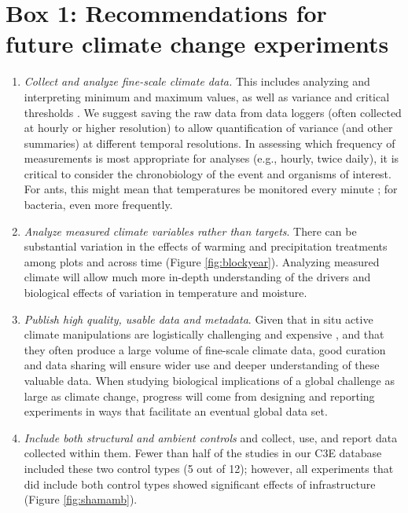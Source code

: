 \documentclass{article}
\begin{document}
\section* {Box 1: Recommendations for future climate change experiments} 
\begin{enumerate}
\item\textit{Collect and analyze fine-scale climate data.} This includes analyzing and interpreting minimum and maximum values, as well as variance and critical thresholds \citep[e.g., the number and duration of freeze-thaw events and accumulated chilling hours,][]{mcdaniel2014,vasseur2014}. We suggest saving the raw data from data loggers (often collected at hourly or higher resolution) to allow quantification of variance (and other summaries) at different temporal resolutions. In assessing which frequency of measurements is most appropriate for analyses (e.g., hourly, twice daily), it is critical to consider the chronobiology of the event and organisms of interest. For ants, this might mean that temperatures be monitored every minute \citep{shavit2017}; for bacteria, even more frequently. 
\item\textit{Analyze measured climate variables rather than targets}. There can be substantial variation in the effects of warming and precipitation treatments among plots and across time (Figure \ref{fig:blockyear}). Analyzing measured climate will allow much more in-depth understanding of the drivers and biological effects of variation in temperature and moisture.
\item\textit{Publish high quality, usable data and metadata}. Given that in situ active climate manipulations are logistically challenging and expensive \citep{aronson2009}, and that they often produce a large volume of fine-scale climate data, good curation and data sharing will ensure wider use and deeper understanding of these valuable data. When studying biological implications of a global challenge as large as climate change, progress will come from designing and reporting experiments in ways that facilitate an eventual global data set. %
\item\textit{Include both structural and ambient controls} and collect, use, and report data collected within them. Fewer than half of the studies in our C3E database included these two control types (5 out of 12); however, all experiments that did include both control types showed significant effects of infrastructure (Figure \ref{fig:shamamb}). %

\end{enumerate}
\end{document}
